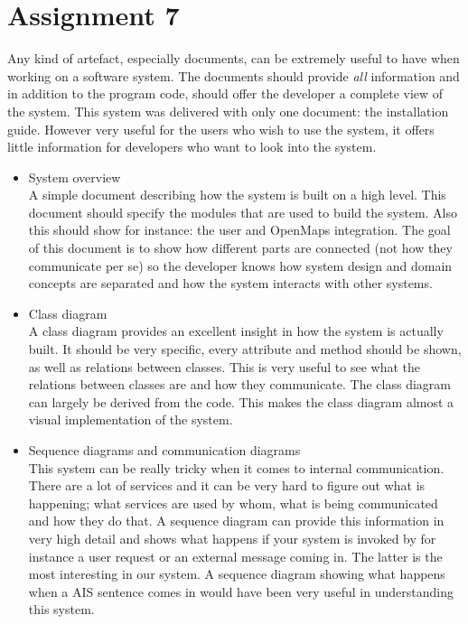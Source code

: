 \documentclass[12pt]{article}
\begin{document}
\section*{Assignment 7}
Any kind of artefact, especially documents, can be extremely useful to have when working on a software system. The documents should provide \emph{all} information and in addition to the program code, should offer the developer a complete view of the system. This system was delivered with only one document: the installation guide. However very useful for the users who wish to use the system, it offers little information for developers who want to look into the system.

\begin{itemize}
\item System overview\\
A simple document describing how the system is built on a high level. This document should specify the modules that are used to build the system. Also this should show for instance: the user and OpenMaps integration. The goal of this document is to show how different parts are connected (not how they communicate per se) so the developer knows how system design and domain concepts are separated and how the system interacts with other systems.

\item Class diagram\\
A class diagram provides an excellent insight in how the system is actually built. It should be very specific, every attribute and method should be shown, as well as relations between classes. This is very useful to see what the relations between classes are and how they communicate. The class diagram can largely be derived from the code. This makes the class diagram almost a visual implementation of the system.

\item Sequence diagrams and communication diagrams \\
This system can be really tricky when it comes to internal communication. There are a lot of services and it can be very hard to figure out what is happening; what services are used by whom, what is being communicated and how they do that. A sequence diagram can provide this information in very high detail and shows what happens if your system is invoked by for instance a user request or an external message coming in. The latter is the most interesting in our system. A sequence diagram showing what happens when a AIS sentence comes in would have been very useful in understanding this system.


\end{itemize}
\end{document}
